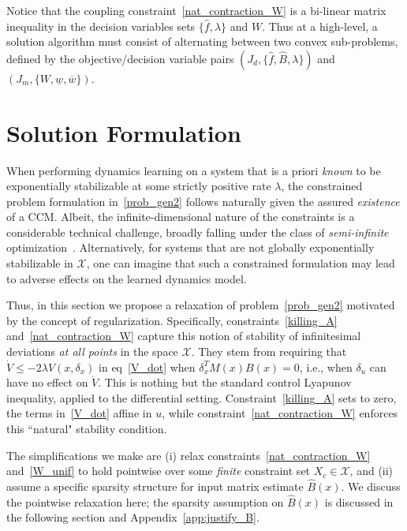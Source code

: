 \documentclass[conference]{svproc}
\newcommand{\X}{\mathcal{X}}
\newcommand{\wl}{\underline{w}}
\newcommand{\wu}{\overline{w}}
\newcommand{\dx}{\delta_x}
\begin{document}
Notice that the coupling constraint~\eqref{nat_contraction_W} is a bi-linear matrix inequality in the decision variables sets $\{\hat{f},\lambda\}$ and $W$. Thus at a high-level, a solution algorithm must consist of alternating between two convex sub-problems, defined by the objective/decision variable pairs $(J_d, \{\hat{f},\hat{B},\lambda\})$ and $(J_m, \{W,\wl,\wu\})$.

\vspace{-3mm}
\section{Solution Formulation}\label{sec:reg}
\vspace{-1mm}

When performing dynamics learning on a system that is a priori \emph{known} to be exponentially stabilizable at some strictly positive rate $\lambda$, the constrained problem formulation in~\eqref{prob_gen2} follows naturally given the assured \emph{existence} of a CCM. Albeit, the infinite-dimensional nature of the constraints is a considerable technical challenge, broadly falling under the class of \emph{semi-infinite} optimization~\cite{HettichKortanek1993}. Alternatively, for systems that are not globally exponentially stabilizable in $\X$, one can imagine that such a constrained formulation may lead to adverse effects on the learned dynamics model. 

Thus, in this section we propose a relaxation of problem~\eqref{prob_gen2} motivated by the concept of regularization. Specifically, constraints~\eqref{killing_A} and~\eqref{nat_contraction_W} capture this notion of stability of infinitesimal deviations \emph{at all points} in the space $\X$. They stem from requiring that $\dot{V} \leq -2\lambda V(x,\dx)$ in eq~\eqref{V_dot} when $\dx^T M(x) B(x) = 0$, i.e., when $\delta_u$ can have no effect on $\dot{V}$. This is nothing but the standard control Lyapunov inequality, applied to the differential setting. Constraint~\eqref{killing_A} sets to zero, the terms in~\eqref{V_dot} affine in $u$, while constraint~\eqref{nat_contraction_W} enforces this ``natural" stability condition. 

The simplifications we make are (i) relax constraints~\eqref{nat_contraction_W} and~\eqref{W_unif} to hold pointwise over some \emph{finite} constraint set $X_c \in \X$, and (ii) assume a specific sparsity structure for input matrix estimate $\hat{B}(x)$. We discuss the pointwise relaxation here; the sparsity assumption on $\hat{B}(x)$ is discussed in the following section and Appendix~\ref{app:justify_B}.
\end{document}
